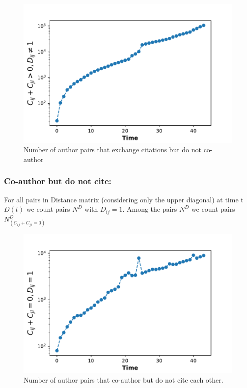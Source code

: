 \documentclass[aps, pre, twocolumn, nofootinbib]{revtex4-1}
\begin{document}
\begin{figure}
	\centering
	\includegraphics[scale = 0.45]{plots/cit_dnot1}
	
	\captionsetup{singlelinecheck=false, justification=raggedright,  labelsep=space}
	\caption{Number of author pairs that exchange citations but do not co-author}
	\label{ftwo}
\end{figure}

\subsubsection{Co-author but do not cite:}
For all pairs in Distance matrix (considering only the upper diagonal) at time t $D(t)$ we count pairs $N^D$ with  $D_{ij} = 1$. Among the pairs $N^D$ we count pairs $N^D_{(C_{ij} + C_{ji}=0)}$
\begin{figure}
	\centering
	\includegraphics[scale = 0.45]{plots/d1_zcit}
	
	\captionsetup{singlelinecheck=false, justification=raggedright,  labelsep=space}
	\caption{Number of author pairs that co-author but do not cite each other.}
	\label{f2}
\end{figure}
\end{document}
